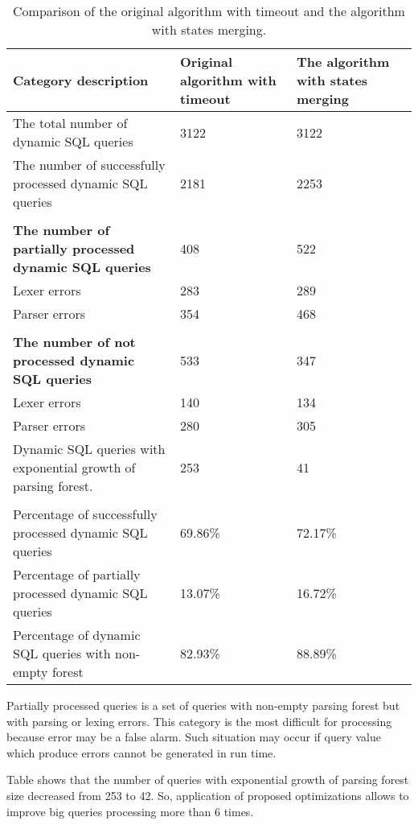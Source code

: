 \begin{center}
\begin{table}
\caption{Comparison of the original algorithm with timeout and the algorithm with states merging.}
\begin{tabular}[c c c]{| p{5.5cm} | p{3cm} | p{3cm} |}
\hline
Category description & Original algorithm with timeout & The algorithm with states merging
\\
\hline
The total number of dynamic SQL queries & 3122 & 3122
\\
\hline
The number of successfully processed dynamic SQL queries & 2181 & 2253
\\
\hline
 & &
\\
\hline
\bfseries{The number of partially processed dynamic SQL queries} & 408 & 522
\\
\hline

 Lexer errors & 283 & 289
\\
\hline

 Parser errors & 354 & 468
\\
\hline
 & &
\\
\hline

\bfseries{The number of not processed dynamic SQL queries} & 533 & 347
\\
\hline
  Lexer errors & 140 & 134
\\
\hline

 Parser errors & 280 & 305
\\
\hline

 Dynamic SQL queries with exponential growth of parsing forest. & 253 & 41

\\
\hline
 & &
\\
\hline


Percentage of successfully processed dynamic SQL queries & 69.86\% & 72.17\%
\\
\hline

Percentage of partially processed dynamic SQL queries & 13.07\% & 16.72\%
\\
\hline

Percentage of dynamic SQL queries with non-empty forest & 82.93\% & 88.89\%
\\
\hline
 
\end{tabular}
\end{table}
\end{center}


Partially processed queries is a set of queries with non-empty parsing forest but with parsing or lexing errors. 
This category is the most difficult for processing because error may be a false alarm. Such situation may 
occur if query value which produce errors cannot be generated in run time.

Table shows that the number of queries with exponential growth of parsing forest size decreased
from 253 to 42. So, application of proposed optimizations allows to improve big queries processing 
more than 6 times.
